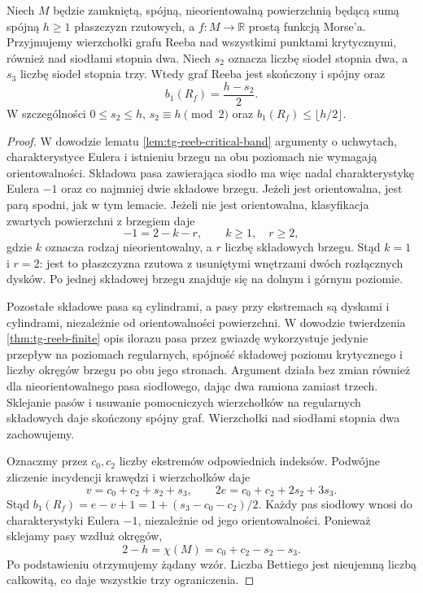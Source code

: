\begin{stwierdzenie}
\label{prop:tg-reeb-nonorientable}
Niech $M$ będzie zamkniętą, spójną, nieorientowalną
powierzchnią będącą sumą spójną $h\ge1$ płaszczyzn
rzutowych, a $f:M\to\mathbb R$ prostą funkcją Morse'a.
Przyjmujemy wierzchołki grafu Reeba nad wszystkimi
punktami krytycznymi, również nad siodłami stopnia dwa.
Niech $s_2$ oznacza liczbę siodeł stopnia dwa,
a $s_3$ liczbę siodeł stopnia trzy.
Wtedy graf Reeba jest skończony i spójny oraz
\[
b_1(R_f)=\frac{h-s_2}{2}.
\]
W szczególności $0\le s_2\le h$,
$s_2\equiv h\pmod 2$ oraz
$b_1(R_f)\le\lfloor h/2\rfloor$.
\end{stwierdzenie}
\begin{proof}
W dowodzie lematu \ref{lem:tg-reeb-critical-band}
argumenty o uchwytach, charakterystyce Eulera
i istnieniu brzegu na obu poziomach nie wymagają
orientowalności. Składowa pasa zawierająca siodło
ma więc nadal charakterystykę Eulera $-1$ oraz
co najmniej dwie składowe brzegu. Jeżeli jest
orientowalna, jest parą spodni, jak w tym lemacie.
Jeżeli nie jest orientowalna, klasyfikacja
zwartych powierzchni z brzegiem daje
\[
-1=2-k-r,\qquad k\ge1,\quad r\ge2,
\]
gdzie $k$ oznacza rodzaj nieorientowalny,
a $r$ liczbę składowych brzegu. Stąd $k=1$ i $r=2$:
jest to płaszczyzna rzutowa z usuniętymi wnętrzami
dwóch rozłącznych dysków. Po jednej składowej
brzegu znajduje się na dolnym i górnym poziomie.

Pozostałe składowe pasa są cylindrami,
a pasy przy ekstremach są dyskami i cylindrami,
niezależnie od orientowalności powierzchni.
W dowodzie twierdzenia \ref{thm:tg-reeb-finite}
opis ilorazu pasa przez gwiazdę wykorzystuje
jedynie przepływ na poziomach regularnych,
spójność składowej poziomu krytycznego
i liczby okręgów brzegu po obu jego stronach.
Argument działa bez zmian również dla
nieorientowalnego pasa siodłowego, dając dwa
ramiona zamiast trzech. Sklejanie pasów
i usuwanie pomocniczych wierzchołków na regularnych
składowych daje skończony spójny graf.
Wierzchołki nad siodłami stopnia dwa zachowujemy.

Oznaczmy przez $c_0,c_2$ liczby ekstremów
odpowiednich indeksów. Podwójne zliczenie
incydencji krawędzi i wierzchołków daje
\[
v=c_0+c_2+s_2+s_3,\qquad
2e=c_0+c_2+2s_2+3s_3.
\]
Stąd $b_1(R_f)=e-v+1=1+(s_3-c_0-c_2)/2$.
Każdy pas siodłowy wnosi do charakterystyki
Eulera $-1$, niezależnie od jego orientowalności.
Ponieważ sklejamy pasy wzdłuż okręgów,
\[
2-h=\chi(M)=c_0+c_2-s_2-s_3.
\]
Po podstawieniu otrzymujemy żądany wzór.
Liczba Bettiego jest nieujemną liczbą całkowitą,
co daje wszystkie trzy ograniczenia.
\end{proof}

